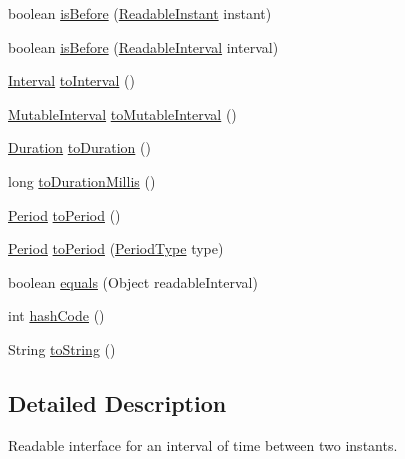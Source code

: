 \begin{DoxyCompactItemize}
boolean \hyperlink{interfaceorg_1_1joda_1_1time_1_1_readable_interval_a1f68b4d8470d640052d4980e27263d4f}{is\-Before} (\hyperlink{interfaceorg_1_1joda_1_1time_1_1_readable_instant}{Readable\-Instant} instant)
\item 
boolean \hyperlink{interfaceorg_1_1joda_1_1time_1_1_readable_interval_a1f48fc4cda759a4db24ef5c0ad7f0609}{is\-Before} (\hyperlink{interfaceorg_1_1joda_1_1time_1_1_readable_interval}{Readable\-Interval} interval)
\item 
\hyperlink{classorg_1_1joda_1_1time_1_1_interval}{Interval} \hyperlink{interfaceorg_1_1joda_1_1time_1_1_readable_interval_a298950dabbde8ceee280cfe39dbf1f63}{to\-Interval} ()
\item 
\hyperlink{classorg_1_1joda_1_1time_1_1_mutable_interval}{Mutable\-Interval} \hyperlink{interfaceorg_1_1joda_1_1time_1_1_readable_interval_a703529e18d8002a21b22c7613e288f29}{to\-Mutable\-Interval} ()
\item 
\hyperlink{classorg_1_1joda_1_1time_1_1_duration}{Duration} \hyperlink{interfaceorg_1_1joda_1_1time_1_1_readable_interval_adceb7aa1c2a95d1981351a81d8bb7509}{to\-Duration} ()
\item 
long \hyperlink{interfaceorg_1_1joda_1_1time_1_1_readable_interval_a4ba781e2333decfe73d23e30dd06dbce}{to\-Duration\-Millis} ()
\item 
\hyperlink{classorg_1_1joda_1_1time_1_1_period}{Period} \hyperlink{interfaceorg_1_1joda_1_1time_1_1_readable_interval_aefa8a3da8ce28aa5aca300891cc5de6d}{to\-Period} ()
\item 
\hyperlink{classorg_1_1joda_1_1time_1_1_period}{Period} \hyperlink{interfaceorg_1_1joda_1_1time_1_1_readable_interval_a1dab1c9c6c2bcd9a9fb18568b72fe08d}{to\-Period} (\hyperlink{classorg_1_1joda_1_1time_1_1_period_type}{Period\-Type} type)
\item 
boolean \hyperlink{interfaceorg_1_1joda_1_1time_1_1_readable_interval_a10464e909e811e84d2d3493f119a5d78}{equals} (Object readable\-Interval)
\item 
int \hyperlink{interfaceorg_1_1joda_1_1time_1_1_readable_interval_a89ede186078339440631f0db40d55d22}{hash\-Code} ()
\item 
String \hyperlink{interfaceorg_1_1joda_1_1time_1_1_readable_interval_af32340c8eb3d8086dac54fe15bc414f2}{to\-String} ()
\end{DoxyCompactItemize}


\subsection{Detailed Description}
Readable interface for an interval of time between two instants. 

